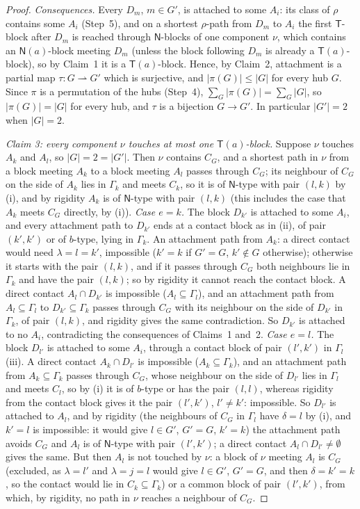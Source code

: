 \documentclass[11pt]{amsart}
\theoremstyle{definition}
\newcommand{\T}{\mathsf{T}}
\newcommand{\N}{\mathsf{N}}
\begin{document}
\begin{proof}
\emph{Consequences.} Every $D_m$, $m\in G'$, is attached to some $A_i$: its class of $\rho$ contains some $A_i$ (Step~5), and on a shortest $\rho$-path from $D_m$ to $A_i$ the first $\T$-block after $D_m$ is reached through $\N$-blocks of one component $\nu$, which contains an $\N(a)$-block meeting $D_m$ (unless the block following $D_m$ is already a $\T(a)$-block), so by Claim~1 it is a $\T(a)$-block. Hence, by Claim~2, attachment is a partial map $\tau\colon G\rightharpoonup G'$ which is surjective, and $|\pi(G)|\le|G|$ for every hub $G$. Since $\pi$ is a permutation of the hubs (Step~4), $\sum_G|\pi(G)|=\sum_G|G|$, so $|\pi(G)|=|G|$ for every hub, and $\tau$ is a bijection $G\to G'$. In particular $|G'|=2$ when $|G|=2$.

\emph{Claim 3: every component $\nu$ touches at most one $\T(a)$-block.} Suppose $\nu$ touches $A_k$ and $A_l$, so $|G|=2=|G'|$. Then $\nu$ contains $C_G$, and a shortest path in $\nu$ from a block meeting $A_k$ to a block meeting $A_l$ passes through $C_G$; its neighbour of $C_G$ on the side of $A_k$ lies in $\Gamma_k$ and meets $C_k$, so it is of $\N$-type with pair $(l,k)$ by (i), and by rigidity $A_k$ is of $\N$-type with pair $(l,k)$ (this includes the case that $A_k$ meets $C_G$ directly, by (i)). \emph{Case $e=k$.} The block $D_{k'}$ is attached to some $A_i$, and every attachment path to $D_{k'}$ ends at a contact block as in (ii), of pair $(k',k')$ or of $b$-type, lying in $\Gamma_k$. An attachment path from $A_k$: a direct contact would need $\lambda=l=k'$, impossible ($k'=k$ if $G'=G$, $k'\notin G$ otherwise); otherwise it starts with the pair $(l,k)$, and if it passes through $C_G$ both neighbours lie in $\Gamma_k$ and have the pair $(l,k)$; so by rigidity it cannot reach the contact block. A direct contact $A_l\cap D_{k'}$ is impossible ($A_l\subseteq\Gamma_l$), and an attachment path from $A_l\subseteq\Gamma_l$ to $D_{k'}\subseteq\Gamma_k$ passes through $C_G$ with its neighbour on the side of $D_{k'}$ in $\Gamma_k$, of pair $(l,k)$, and rigidity gives the same contradiction. So $D_{k'}$ is attached to no $A_i$, contradicting the consequences of Claims~1 and~2. \emph{Case $e=l$.} The block $D_{l'}$ is attached to some $A_i$, through a contact block of pair $(l',k')$ in $\Gamma_l$ (iii). A direct contact $A_k\cap D_{l'}$ is impossible ($A_k\subseteq\Gamma_k$), and an attachment path from $A_k\subseteq\Gamma_k$ passes through $C_G$, whose neighbour on the side of $D_{l'}$ lies in $\Gamma_l$ and meets $C_l$, so by (i) it is of $b$-type or has the pair $(l,l)$, whereas rigidity from the contact block gives it the pair $(l',k')$, $l'\ne k'$: impossible. So $D_{l'}$ is attached to $A_l$, and by rigidity (the neighbours of $C_G$ in $\Gamma_l$ have $\delta=l$ by (i), and $k'=l$ is impossible: it would give $l\in G'$, $G'=G$, $k'=k$) the attachment path avoids $C_G$ and $A_l$ is of $\N$-type with pair $(l',k')$; a direct contact $A_l\cap D_{l'}\ne\emptyset$ gives the same. But then $A_l$ is not touched by $\nu$: a block of $\nu$ meeting $A_l$ is $C_G$ (excluded, as $\lambda=l'$ and $\lambda=j=l$ would give $l\in G'$, $G'=G$, and then $\delta=k'=k$, so the contact would lie in $C_k\subseteq\Gamma_k$) or a common block of pair $(l',k')$, from which, by rigidity, no path in $\nu$ reaches a neighbour of $C_G$.


\end{proof}
\end{document}

